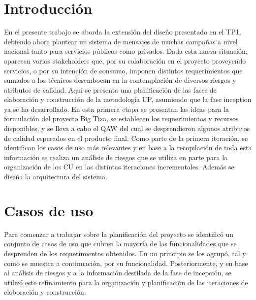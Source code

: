 \documentclass[a4paper, 10pt, twoside]{article}
\begin{document}
\newpage

\tableofcontents

\newpage



\section{Introducción}

En el presente trabajo se aborda la extensión del diseño presentado en el TP1, debiendo ahora plantear un sistema de mensajes de muchas campañas a nivel nacional tanto para servicios públicos como privados. Dada esta nueva situación, aparecen varios stakeholders que, por su colaboración en el proyecto proveyendo servicios, o por su intención de consumo, imponen distintos requerimientos que sumados a los técnicos desembocan en la contemplación de diversos riesgos y atributos de calidad.
Aquí se presenta una planificación de las fases de elaboración y construcción de la metodología UP, asumiendo que la fase inception ya se ha desarrollado. En esta primera etapa se presentan las ideas para la formulación del proyecto Big Tiza, se establecen los requerimientos y recursos disponibles, y se lleva a cabo el QAW del cual se desprendieron algunos atributos de calidad esperados en el producto final. Como parte de la primera iteración, se identifican los casos de uso más relevantes y en base a la recopilación de toda esta información se realiza un análisis de riesgos que se utiliza en parte para la organización de los CU en las distintas iteraciones incrementales. Además se diseña la arquitectura del sistema.

\newpage


\section{Casos de uso}
Para comenzar a trabajar sobre la planificación del proyecto se identificó un conjunto de casos de uso que cubren la mayoría de las funcionalidades que se desprenden de los requerimientos obtenidos. En un principio se los agrupó, tal y como se muestra a continuación, por su funcionalidad. Posteriormente, y en base al análisis de riesgos y a la información destilada de la fase de incepción, se utilizó este refinamiento para la organización y planificación de las iteraciones de elaboración y construcción.
\end{document}
